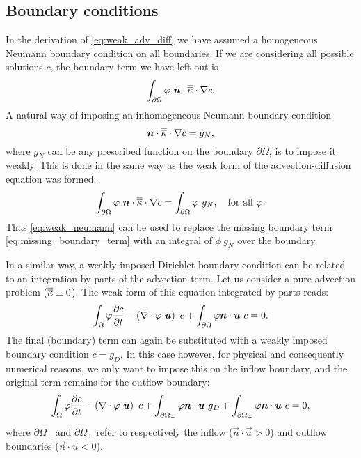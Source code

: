 \subsection{Boundary conditions}
In the derivation of \eqref{eq:weak_adv_diff} we have assumed a homogeneous Neumann
boundary condition on all boundaries. If we are considering all possible
solutions $c$, the boundary term we have left out is
\begin{equation}\label{eq:missing_boundary_term}
  \int_{\partial\Omega} \varphi~{\mbox{\boldmath$n$}}\cdot\overline{\overline{\kappa}}\cdot\nabla c.
\end{equation}
A natural way of imposing an inhomogeneous Neumann boundary condition
\begin{equation*}
  {\mbox{\boldmath$n$}}\cdot\overline{\overline{\kappa}}\cdot\nabla c=g_N,
\end{equation*}
where $g_N$ can be any prescribed function on the boundary $\partial\Omega$, is to impose it
weakly. This is done in the same way as the weak form of the advection-diffusion equation was formed:
\begin{equation}\label{eq:weak_neumann}
  \int_{\partial\Omega} \varphi~{\mbox{\boldmath$n$}}\cdot\overline{\overline{\kappa}}\cdot\nabla c=
    \int_{\partial\Omega} \varphi~g_N, \quad \text{for all }\varphi.
\end{equation}
Thus \eqref{eq:weak_neumann} can be used to replace the missing
boundary term \eqref{eq:missing_boundary_term} with an integral of $\phi~g_N$
over the boundary.

In a similar way, a weakly imposed Dirichlet boundary condition can be related to an
integration by parts of the advection term. Let us consider a pure advection problem
($\overline{\overline{\kappa}}\equiv 0$). The weak form of this equation integrated by parts reads:
\begin{equation*}
  \int_\Omega \varphi \frac{\partial c}{\partial t} -
    \left(\nabla\cdot \varphi~{\mbox{\boldmath$u$}}\right)~c +
    \int_{\partial\Omega} \varphi {\mbox{\boldmath$n$}}\cdot{\mbox{\boldmath$u$}}~c
    = 0.
\end{equation*}
The final (boundary) term can again be substituted with a weakly imposed
boundary condition $c=g_D$.  In this case however, for physical and consequently numerical reasons, we only want to impose
this on the inflow boundary, and the original term remains for the outflow
boundary:
\begin{equation}\label{eq:adv_integrated_by_parts}
  \int_\Omega \varphi \frac{\partial c}{\partial t} -
    \left(\nabla\cdot \varphi~{\mbox{\boldmath$u$}}\right)~c +
    \int_{\partial\Omega_-} \varphi{\mbox{\boldmath$n$}}\cdot{\mbox{\boldmath$u$}}~g_D +
    \int_{\partial\Omega_+} \varphi{\mbox{\boldmath$n$}}\cdot{\mbox{\boldmath$u$}}~c
    = 0,
\end{equation}
where $\partial\Omega_-$ and $\partial\Omega_+$ refer to respectively
the inflow ($\vec{n}\cdot\vec{u}>0$) and outflow boundaries ($\vec{n}\cdot\vec{u}<0$).

